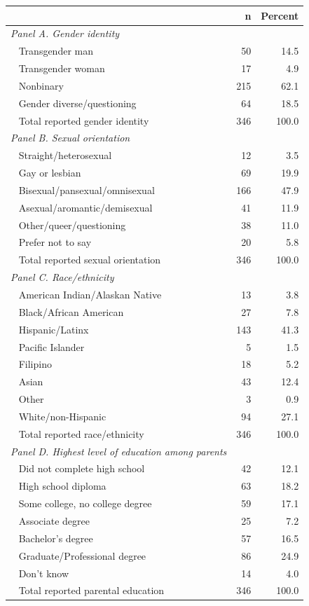 
\begin{tabular}{@{}lrr@{}}
\toprule
 & n & Percent \\
\midrule
\bottomrule
\emph{Panel A. Gender identity} & & \\
\quad ~ Transgender man & 50 & 14.5 \\
\quad ~ Transgender woman & 17 & 4.9 \\
\quad ~ Nonbinary & 215 & 62.1 \\
\quad ~ Gender diverse/questioning & 64 & 18.5 \\
\midrule
~ Total reported gender identity & 346 & 100.0 \\
\midrule
\emph{Panel B. Sexual orientation} & & \\
\quad ~ Straight/heterosexual & 12 & 3.5 \\
\quad ~ Gay or lesbian & 69 & 19.9 \\
\quad ~ Bisexual/pansexual/omnisexual & 166 & 47.9 \\
\quad ~ Asexual/aromantic/demisexual & 41 & 11.9 \\
\quad ~ Other/queer/questioning & 38 & 11.0 \\
\quad ~ Prefer not to say & 20 & 5.8 \\
\midrule
~ Total reported sexual orientation & 346 & 100.0 \\
\midrule
\emph{Panel C. Race/ethnicity} & & \\
\quad ~ American Indian/Alaskan Native & 13 & 3.8 \\
\quad ~ Black/African American & 27 & 7.8 \\
\quad ~ Hispanic/Latinx & 143 & 41.3 \\
\quad ~ Pacific Islander & 5 & 1.5 \\
\quad ~ Filipino & 18 & 5.2 \\
\quad ~ Asian & 43 & 12.4 \\
\quad ~ Other & 3 & 0.9 \\
\quad ~ White/non-Hispanic & 94 & 27.1 \\
\midrule
~ Total reported race/ethnicity & 346 & 100.0 \\
\midrule
\emph{Panel D. Highest level of education among
parents} & & \\
\quad ~ Did not complete high school & 42 & 12.1 \\
\quad ~ High school diploma & 63 & 18.2 \\
\quad ~ Some college, no college degree & 59 & 17.1 \\
\quad ~ Associate degree & 25 & 7.2 \\
\quad ~ Bachelor's degree & 57 & 16.5 \\
\quad ~ Graduate/Professional degree & 86 & 24.9 \\
\quad ~ Don't know & 14 & 4.0 \\
\midrule
~ Total reported parental education & 346 & 100.0 \\
\bottomrule\bottomrule
\end{tabular}
